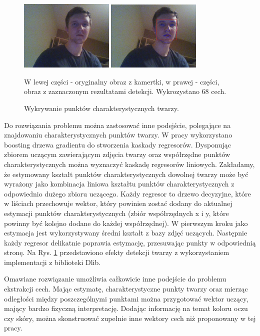 \documentclass[oneside, eng]{mgr}
\begin{document}
\begin{figure}
\centering
	\includegraphics[width=0.40\textwidth,natwidth=310,natheight=642]{test.jpg}
	\includegraphics[width=0.40\textwidth,natwidth=310,natheight=642]{test_result.jpg}
\caption{Wykrywanie punktów charakterystycznych twarzy.}
W lewej części - oryginalny obraz z kamertki, w prawej - części, obraz z zaznaczonym rezultatami detekcji. Wykrozystano 68 cech.
	\label{fig:face_landmark_detect}
\end{figure}

Do rozwiązania problemu można zastosować inne podejście, polegające na znajdowaniu charakterystycznych punktów twarzy. W pracy \cite{Landmark face detector} wykorzystano boosting drzewa gradientu do stworzenia kaskady regresorów. Dysponując zbiorem uczącym zawierającym zdjęcia twarzy oraz współrzędne punktów charakterystycznych można wyznaczyć kaskadę regresorów liniowych. Zakładamy, że estymowany kształt punktów charakterystycznych dowolnej twarzy może być wyrażony jako kombinacja liniowa kształtu punktów charakterystycznych z odpowiednio dużego zbioru uczącego. Każdy regresor to drzewo decyzyjne, które w liściach przechowuje wektor, który powinien zostać dodany do aktualnej estymacji punktów charakterystycznych (zbiór współrzędnych x i y, które powinny być kolejno dodane do każdej współrzędnej). W pierwszym kroku jako estymacja jest wykorzystywany średni kształt z bazy zdjęć uczących. Następnie każdy regresor delikatnie poprawia estymację, przesuwając punkty w odpowiednią stronę. Na Rys. \ref{fig:face_landmark_detect} przedstawiono efekty detekcji twarzy z wykorzystaniem implementacji z biblioteki Dlib.

Omawiane rozwiązanie umożliwia całkowicie inne podejście do problemu ekstrakcji cech. Mając estymatę, charakterystyczne punkty twarzy oraz mierząc odległości między poszczególnymi punktami można przygotować wektor uczący, mający bardzo fizyczną interpretację. Dodając informację na temat koloru oczu czy skóry, można skonstruować zupełnie inne wektory cech niż proponowany w tej pracy. 
\end{document}
